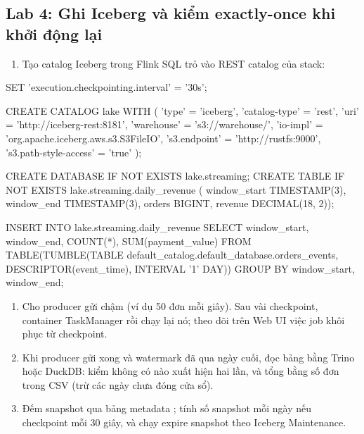 \subsection{Lab 4: Ghi Iceberg và kiểm exactly-once khi khởi động lại}
\begin{enumerate}
  \item Tạo catalog Iceberg trong Flink SQL trỏ vào REST catalog của stack:
\end{enumerate}
\begin{codeblock}
SET 'execution.checkpointing.interval' = '30s';

CREATE CATALOG lake WITH (
  'type' = 'iceberg',
  'catalog-type' = 'rest',
  'uri' = 'http://iceberg-rest:8181',
  'warehouse' = 's3://warehouse/',
  'io-impl' = 'org.apache.iceberg.aws.s3.S3FileIO',
  's3.endpoint' = 'http://rustfs:9000',
  's3.path-style-access' = 'true'
);

CREATE DATABASE IF NOT EXISTS lake.streaming;
CREATE TABLE IF NOT EXISTS lake.streaming.daily_revenue (
  window_start TIMESTAMP(3), window_end TIMESTAMP(3),
  orders BIGINT, revenue DECIMAL(18, 2));

INSERT INTO lake.streaming.daily_revenue
SELECT window_start, window_end, COUNT(*), SUM(payment_value)
FROM TABLE(TUMBLE(TABLE default_catalog.default_database.orders_events,
                  DESCRIPTOR(event_time), INTERVAL '1' DAY))
GROUP BY window_start, window_end;
\end{codeblock}
\begin{enumerate}[resume]
  \item Cho producer gửi chậm (ví dụ 50 đơn mỗi giây). Sau vài checkpoint,  container TaskManager rồi chạy lại nó; theo dõi trên Web UI việc job khôi phục từ checkpoint.
  \item Khi producer gửi xong và watermark đã qua ngày cuối, đọc bảng bằng Trino hoặc DuckDB: kiểm không có  nào xuất hiện hai lần, và tổng  bằng số đơn trong CSV (trừ các ngày chưa đóng cửa sổ).
  \item Đếm snapshot qua bảng metadata ; tính số snapshot mỗi ngày nếu checkpoint mỗi 30 giây, và chạy expire snapshot theo Iceberg Maintenance.
\end{enumerate}

